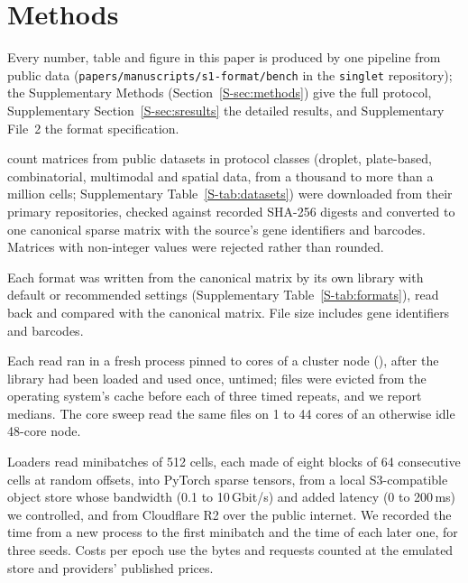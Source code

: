 \section{Methods}
\label{sec:setup}\label{sec:mmethods}

Every number, table and figure in this paper is produced by one pipeline from public data
(\texttt{papers/manuscripts/s1-format/bench} in the \texttt{singlet} repository); the Supplementary Methods
(Section~\ref{S-sec:methods}) give the full protocol, Supplementary Section~\ref{S-sec:sresults} the detailed results, and
Supplementary File~2 the format specification.

 count matrices from  public datasets in  protocol classes
(droplet, plate-based, combinatorial, multimodal and spatial data, from a thousand to more than a million cells;
Supplementary Table~\ref{S-tab:datasets}) were downloaded from their primary repositories, checked against recorded
SHA-256 digests and converted to one canonical sparse matrix with the source's gene identifiers and barcodes. Matrices with
non-integer values were rejected rather than rounded.

Each format was written from the canonical matrix by its own library with default or recommended settings
(Supplementary Table~\ref{S-tab:formats}), read back and compared with the canonical matrix. File size includes gene
identifiers and barcodes.

Each read ran in a fresh process pinned to  cores of a cluster node (), after
the library had been loaded and used once, untimed; files were evicted from the operating system's cache before each of
three timed repeats, and we report medians. The core sweep read the same files on 1 to 44 cores of an otherwise idle
48-core node.

Loaders read minibatches of 512 cells, each made of eight blocks of 64 consecutive cells at random
offsets, into PyTorch sparse tensors, from a local S3-compatible object store whose bandwidth (0.1 to 10\,Gbit/s) and added
latency (0 to 200\,ms) we controlled, and from Cloudflare R2 over the public internet. We recorded the time from a new
process to the first minibatch and the time of each later one, for three seeds. Costs per epoch use the bytes and requests
counted at the emulated store and providers' published prices.

